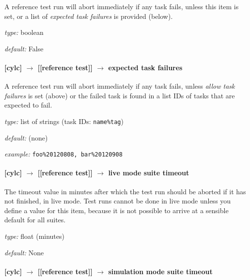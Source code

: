 A reference test run will abort immediately if any task fails, unless
this item is set, or a list of {\em expected task failures} is provided
(below).

\begin{myitemize}
    \item {\em type:} boolean
    \item {\em default:} False
\end{myitemize}

\paragraph[expected task failures]{[cylc] $\rightarrow$ [[reference test]] $\rightarrow$ expected task failures}

A reference test run will abort immediately if any task fails, unless
{\em allow task failures} is set (above) or the failed task is found 
in a list IDs of tasks that are expected to fail.

\begin{myitemize}
    \item {\em type:} list of strings (task IDs: \lstinline=name%tag=)
    \item {\em default:} (none)
    \item {\em example:} \lstinline=foo%20120808, bar%20120908=
\end{myitemize}

\paragraph[live mode suite timeout]{[cylc] $\rightarrow$ [[reference test]] $\rightarrow$ live mode suite timeout}

The timeout value in minutes after which the test run should be aborted
if it has not finished, in live mode. Test runs cannot be done in live
mode unless you define a value for this item, because it is not possible
to arrive at a sensible default for all suites.

\begin{myitemize}
    \item {\em type:} float (minutes)
    \item {\em default:} None
\end{myitemize}

\paragraph[simulation mode suite timeout]{[cylc] $\rightarrow$ [[reference test]] $\rightarrow$ simulation mode suite timeout}

